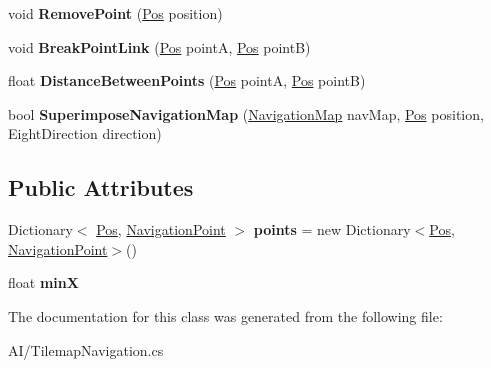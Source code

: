 \begin{DoxyCompactItemize}
void {\bfseries Remove\+Point} (\mbox{\hyperlink{struct_stompy_blondie_1_1_common_1_1_types_1_1_pos}{Pos}} position)
\item 
\mbox{\label{class_stompy_blondie_1_1_a_i_1_1_navigation_map_aa49f9eb7f626fad4bbbb9ddd411fa41d}} 
void {\bfseries Break\+Point\+Link} (\mbox{\hyperlink{struct_stompy_blondie_1_1_common_1_1_types_1_1_pos}{Pos}} pointA, \mbox{\hyperlink{struct_stompy_blondie_1_1_common_1_1_types_1_1_pos}{Pos}} pointB)
\item 
\mbox{\label{class_stompy_blondie_1_1_a_i_1_1_navigation_map_a0ce1fac02a5a31b904baada6aff83bcd}} 
float {\bfseries Distance\+Between\+Points} (\mbox{\hyperlink{struct_stompy_blondie_1_1_common_1_1_types_1_1_pos}{Pos}} pointA, \mbox{\hyperlink{struct_stompy_blondie_1_1_common_1_1_types_1_1_pos}{Pos}} pointB)
\item 
\mbox{\label{class_stompy_blondie_1_1_a_i_1_1_navigation_map_a059f94fa6e73419756517f761f2bb3f5}} 
bool {\bfseries Superimpose\+Navigation\+Map} (\mbox{\hyperlink{class_stompy_blondie_1_1_a_i_1_1_navigation_map}{Navigation\+Map}} nav\+Map, \mbox{\hyperlink{struct_stompy_blondie_1_1_common_1_1_types_1_1_pos}{Pos}} position, Eight\+Direction direction)
\end{DoxyCompactItemize}
\subsection*{Public Attributes}
\begin{DoxyCompactItemize}
\item 
\mbox{\label{class_stompy_blondie_1_1_a_i_1_1_navigation_map_af4f71225b8d491f23974e2b4cf2d18e9}} 
Dictionary$<$ \mbox{\hyperlink{struct_stompy_blondie_1_1_common_1_1_types_1_1_pos}{Pos}}, \mbox{\hyperlink{struct_stompy_blondie_1_1_a_i_1_1_navigation_point}{Navigation\+Point}} $>$ {\bfseries points} = new Dictionary$<$\mbox{\hyperlink{struct_stompy_blondie_1_1_common_1_1_types_1_1_pos}{Pos}}, \mbox{\hyperlink{struct_stompy_blondie_1_1_a_i_1_1_navigation_point}{Navigation\+Point}}$>$()
\item 
\mbox{\label{class_stompy_blondie_1_1_a_i_1_1_navigation_map_a2db7ec95521970ba1e2eafbeaf3418fc}} 
float {\bfseries minX}
\end{DoxyCompactItemize}


The documentation for this class was generated from the following file\+:\begin{DoxyCompactItemize}
\item 
A\+I/Tilemap\+Navigation.\+cs\end{DoxyCompactItemize}
